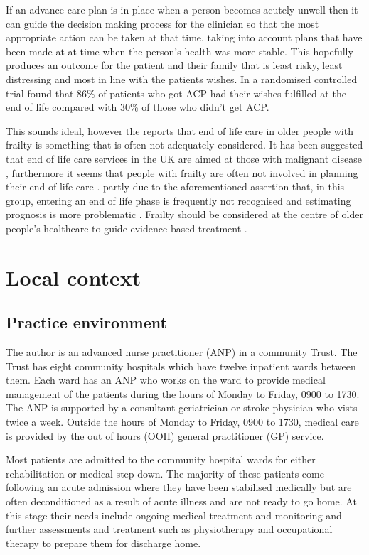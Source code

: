 \documentclass
[
	12pt,
	a4paper,
	oneside,
]{report}
\begin{document}
If an advance care plan is in place when a person becomes acutely unwell then it
can guide the decision making process for the clinician so that the most appropriate
action can be taken at that time, taking into account plans that have been made 
at at time when the person's health was more stable. This hopefully produces an
outcome for the patient and their family that is least risky, least distressing
and most in line with the patients wishes. In a randomised controlled trial
\textcite{detering:10} found that 86\% of patients who got ACP had their wishes
fulfilled at the end of life compared with 30\% of those who didn't get ACP.

This sounds ideal, however the \textcite{silver:12} reports that end of life care 
in older people with frailty
is something that is often not adequately considered. It has been suggested that 
end of life care services in the UK are aimed at those with malignant 
disease \parencite{sharp:13}, furthermore it seems that people with frailty 
are often not involved in planning their 
end-of-life care \textcite{oliver:14}. partly due to the aforementioned assertion 
that, in this group, entering an end of life phase is frequently not recognised 
\textcite{wallington:16} and
estimating prognosis is more problematic \parencite{silver:12}.
Frailty should be considered at the centre of older people's healthcare to guide
evidence based treatment \parencite{woo:14}.

\section{Local context}

\subsection{Practice environment}
\label{sec:local-practice}
The author is an advanced nurse practitioner (ANP) in a community Trust.
The Trust has eight community hospitals which have twelve inpatient wards between
them. Each ward has
an ANP who works on the ward to provide medical management of the patients during 
the hours of Monday to Friday, 0900 to 1730. The ANP is supported by a consultant
geriatrician or stroke physician who vists twice a week. Outside the hours of 
Monday to Friday, 0900 to 1730, medical care 
is provided by the out of hours (OOH) general practitioner (GP) service. 

Most patients are admitted to the community hospital wards for either rehabilitation
or medical step-down. The majority of these patients come following an acute admission
where they have been stabilised medically but are often deconditioned as a result
of acute illness and are not ready to go home. At this stage their needs include 
ongoing medical treatment and monitoring and further assessments and treatment such 
as physiotherapy and occupational therapy to prepare them for discharge home.
\end{document}
